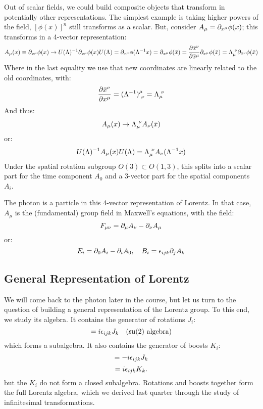 Out of scalar fields, we could build composite objects that transform in potentially other representations. The simplest example is taking higher powers of the field, $[\phi(x)]^n$ still transforms as a scalar. But, consider $A_\mu = \partial_{x^\mu}\phi(x)$; this transforms in a 4-vector representation:
\begin{equation}
    A_\mu(x) \equiv \p_{x^\mu}\phi(x) \to U(\Lambda)^{-1}\p_{x^\mu}\phi(x)U(\Lambda) = \p_{x^\mu}\phi(\Lambda^{-1}x) = \p_{x^\mu}\phi(\bar{x}) = \frac{\partial \bar{x}^\nu}{\partial \bar{x}^\mu}\p_{x^\mu}\phi(\bar{x}) = \Lambda^{\sp \nu}_{\mu}\p_{\bar{x}^\nu}\phi(\bar{x})
\end{equation} 
Where in the last equality we use that new coordinates are linearly related to the old coordinates, with:
\begin{equation}
    \frac{\partial \bar{x}^\nu}{\partial x^\mu} = (\Lambda^{-1})^{\mu}_{\sp\nu} = \Lambda^{\sp \nu}_{\mu}
\end{equation}
And thus:
\begin{equation}
    A_\mu(x) \to \Lambda^{\sp \nu}_{\mu}A_\nu(\bar{x})
\end{equation}
or:
\begin{equation}
    U(\Lambda)^{-1}A_\mu(x)U(\Lambda) = \Lambda_{\mu}^{\sp\nu} A_\nu(\Lambda^{-1}x)
\end{equation}
Under the spatial rotation subgroup $O(3) \subset O(1, 3)$, this splits into a scalar part for the time component $A_0$ and a 3-vector part for the spatial components $A_i$.

The photon is a particle in this 4-vector representation of Lorentz. In that case, $A_\mu$ is the (fundamental) group field in Maxwell's equations, with the field:
\begin{equation}
    F_{\mu\nu} = \partial_\mu A_\nu - \partial_\nu A_\mu
\end{equation}
or:
\begin{equation}
    E_i = \partial_0 A_i - \partial_i A_0, \quad B_i = \epsilon_{ijk}\partial_jA_k
\end{equation}

\subsection{General Representation of Lorentz}
We will come back to the photon later in the course, but let us turn to the question of building a general representation of the Lorentz group. To this end, we study its algebra. It contains the generator of rotations $J_i$:
\begin{equation}
    [J_i, J_j] = i\e_{ijk}J_k \quad \text{($\mathfrak{su}(2)$ algebra)}
\end{equation}
which forms a subalgebra. It also contains the generator of boosts $K_i$:
\begin{equation}
    [K_i, K_j] = -i\e_{ijk}J_k
\end{equation}
\begin{equation}
    [J_i, K_j]= i\e_{ijk}K_k.
\end{equation}
but the $K_i$ do not form a closed subalgebra. Rotations and boosts together form the full Lorentz algebra, which we derived last quarter through the study of infinitesimal transformations.

